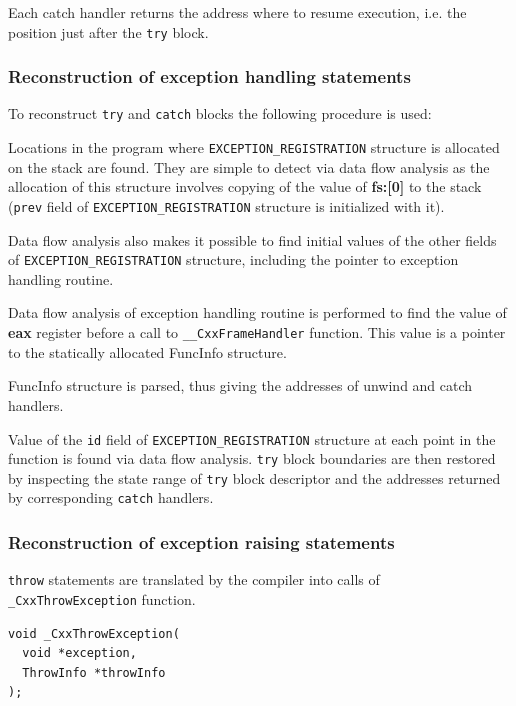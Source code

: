 \documentclass[times, 10pt,twocolumn]{article}
\renewcommand{\~}{{\raise.35ex\hbox{$\scriptstyle\sim$}}}
\renewenvironment{itemize}{
    \begin{list}{\labelitemi}{\itemsep=-\parsep}
}{
	\end{list}
}
\begin{document}
Each catch handler returns the address where to resume execution, i.e. the position
just after the \lstinline{try} block.



\quad
\subsubsection{Reconstruction of exception handling statements}
To reconstruct \lstinline{try} and \lstinline{catch} blocks the following procedure is used:
\begin{itemize}
\item Locations in the program where \lstinline{EXCEPTION_REGISTRATION} structure is allocated
    on the stack are found. They are simple to detect via data flow analysis as the allocation
    of this structure involves copying of the value of \textbf{fs:[0]} to the stack
    (\lstinline{prev} field of \lstinline{EXCEPTION_REGISTRATION} structure is initialized with it).
\item Data flow analysis also makes it possible to find initial values of the other fields of
    \lstinline{EXCEPTION_REGISTRATION} structure, including the pointer to exception
    handling routine.
\item Data flow analysis of exception handling routine is performed to find the value of
    \textbf{eax} register before a call to \lstinline{__CxxFrameHandler} function. This value
    is a pointer to the statically allocated FuncInfo structure.
\item FuncInfo structure is parsed, thus giving the addresses of unwind and catch handlers.
\item Value of the \lstinline{id} field of \lstinline{EXCEPTION_REGISTRATION} structure
    at each point in the function is found via data flow analysis. \lstinline{try} block boundaries are
    then restored by inspecting the state range of \lstinline{try} block descriptor and the addresses returned by
    corresponding \lstinline{catch} handlers.
\end{itemize}



\quad
\subsubsection{Reconstruction of exception raising statements}
\lstinline{throw} statements are translated by the compiler into calls of
\lstinline{_CxxThrowException} function.
{
\lstset{basicstyle=\small}
\begin{lstlisting}
void _CxxThrowException(
  void *exception,
  ThrowInfo *throwInfo
);
\end{lstlisting}
}
\end{document}
